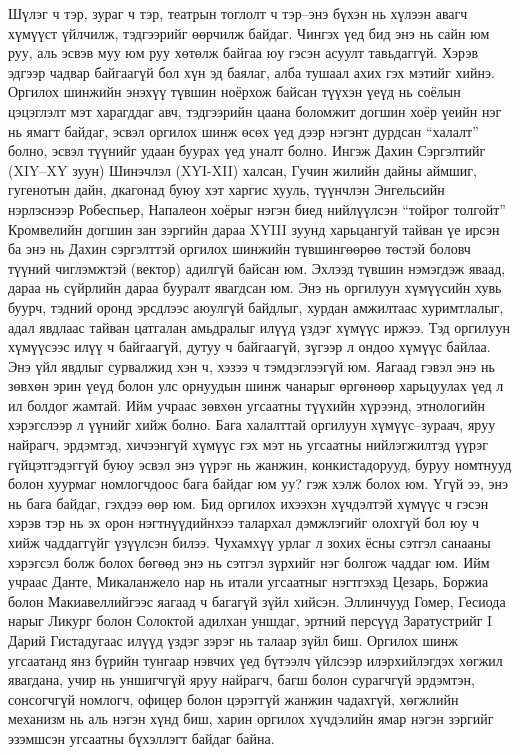 Шүлэг ч тэр, зураг ч тэр, театрын тоглолт ч тэр–энэ бүхэн нь хүлээн авагч хүмүүст үйлчилж, тэдгээрийг өөрчилж байдаг. Чингэх үед бид энэ нь сайн юм руу, аль эсвэв муу юм руу хөтөлж байгаа юу гэсэн асуулт тавьдаггүй. Хэрэв эдгээр чадвар байгаагүй бол хүн эд баялаг, алба тушаал ахих гэх мэтийг хийнэ. Оргилох шинжийн энэхүү түвшин ноёрхож байсан түүхэн үеүд нь соёлын цэцэглэлт мэт харагддаг авч, тэдгээрийн цаана боломжит догшин хоёр үеийн нэг нь ямагт байдаг, эсвэл оргилох шинж өсөх үед дээр нэгэнт дурдсан “халалт” болно, эсвэл түүнийг удаан буурах үед уналт болно. Ингэж Дахин Сэргэлтийг (XIY–XY зуун) Шинэчлэл (XYI-XII) халсан, Гучин жилийн дайны аймшиг, гугенотын дайн, дкагонад буюу хэт харгис хууль, түүнчлэн Энгельсийн нэрлэснээр Робеспьер, Напалеон хоёрыг нэгэн биед нийлүүлсэн “тойрог толгойт” Кромвелийн догшин зан зэргийн дараа XYIII зуунд харьцангуй тайван үе ирсэн ба энэ нь Дахин сэргэлттэй оргилох шинжийн түвшингөөрөө төстэй боловч түүний чиглэмжтэй (вектор) адилгүй байсан юм. Эхлээд түвшин нэмэгдэж яваад, дараа нь сүйрлийн дараа бууралт явагдсан юм. Энэ нь оргилуун хүмүүсийн хувь буурч, тэдний оронд эрсдлээс аюулгүй байдлыг, хурдан амжилтаас хуримтлалыг, адал явдлаас тайван цатгалан амьдралыг илүүд үздэг хүмүүс иржээ. Тэд оргилуун хүмүүсээс илүү ч байгаагүй, дутуу ч байгаагүй, зүгээр л ондоо хүмүүс байлаа.
Энэ үйл явдлыг сурвалжид хэн ч, хэзээ ч тэмдэглээгүй юм. Яагаад гэвэл энэ нь зөвхөн эрин үеүд болон улс орнуудын шинж чанарыг өргөнөөр харьцуулах үед л ил болдог жамтай. Ийм учраас зөвхөн угсаатны түүхийн хүрээнд, этнологийн хэрэгслээр л үүнийг хийж болно.
Бага халалттай оргилуун хүмүүс–зураач, яруу найрагч, эрдэмтэд, хичээнгүй хүмүүс гэх мэт нь угсаатны нийлэгжилтэд үүрэг гүйцэтгэдэггүй буюу эсвэл энэ үүрэг нь жанжин, конкистадорууд, буруу номтнууд болон хуурмаг номлогчдоос бага байдаг юм уу? гэж хэлж болох юм. Үгүй ээ, энэ нь бага байдаг, гэхдээ өөр юм. Бид оргилох ихээхэн хүчдэлтэй хүмүүс ч гэсэн хэрэв тэр нь эх орон нэгтнүүдийнхээ талархал дэмжлэгийг олохгүй бол юу ч хийж чаддаггүйг үзүүлсэн билээ. Чухамхүү урлаг л зохих ёсны сэтгэл санааны хэрэгсэл болж болох бөгөөд энэ нь сэтгэл зүрхийг нэг болгож чаддаг юм. Ийм учраас Данте, Микаланжело нар нь итали угсаатныг нэгтгэхэд Цезарь, Боржиа болон Макиавеллийгээс яагаад ч багагүй зүйл хийсэн. Эллинчууд Гомер, Гесиода нарыг Ликург болон Солоктой адилхан уншдаг, эртний персүүд Заратустрийг I Дарий Гистадугаас илүүд үздэг зэрэг нь талаар зүйл биш. Оргилох шинж угсаатанд янз бүрийн тунгаар нэвчих үед бүтээлч үйлсээр илэрхийлэгдэх хөгжил явагдана, учир нь уншигчгүй яруу найрагч, багш болон сурагчгүй эрдэмтэн, сонсогчгүй номлогч, офицер болон цэрэггүй жанжин чадахгүй, хөгжлийн механизм нь аль нэгэн хүнд биш, харин оргилох хүчдэлийн ямар нэгэн зэргийг эзэмшсэн угсаатны бүхэллэгт байдаг байна.
